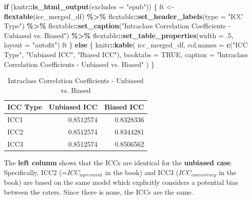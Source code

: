 \documentclass[
]{book}
\newenvironment{Shaded}{\begin{snugshade}}{\end{snugshade}}
\newcommand{\AttributeTok}[1]{\textcolor[rgb]{0.13,0.29,0.53}{#1}}
\newcommand{\ConstantTok}[1]{\textcolor[rgb]{0.56,0.35,0.01}{#1}}
\newcommand{\ControlFlowTok}[1]{\textcolor[rgb]{0.13,0.29,0.53}{\textbf{#1}}}
\newcommand{\DecValTok}[1]{\textcolor[rgb]{0.00,0.00,0.81}{#1}}
\newcommand{\FunctionTok}[1]{\textcolor[rgb]{0.13,0.29,0.53}{\textbf{#1}}}
\newcommand{\NormalTok}[1]{#1}
\newcommand{\OtherTok}[1]{\textcolor[rgb]{0.56,0.35,0.01}{#1}}
\newcommand{\SpecialCharTok}[1]{\textcolor[rgb]{0.81,0.36,0.00}{\textbf{#1}}}
\newcommand{\StringTok}[1]{\textcolor[rgb]{0.31,0.60,0.02}{#1}}
\newcounter{none} %
\begin{document}
\begin{Shaded}
\begin{Highlighting}[]
\ControlFlowTok{if}\NormalTok{ (knitr}\SpecialCharTok{::}\FunctionTok{is\_html\_output}\NormalTok{(}\AttributeTok{excludes =} \StringTok{"epub"}\NormalTok{)) \{}
\NormalTok{  ft }\OtherTok{\textless{}{-}} \FunctionTok{flextable}\NormalTok{(icc\_merged\_df) }\SpecialCharTok{\%\textgreater{}\%}
\NormalTok{    flextable}\SpecialCharTok{::}\FunctionTok{set\_header\_labels}\NormalTok{(}\AttributeTok{type =} \StringTok{"ICC Type"}\NormalTok{) }\SpecialCharTok{\%\textgreater{}\%}
\NormalTok{    flextable}\SpecialCharTok{::}\FunctionTok{set\_caption}\NormalTok{(}\StringTok{"Intraclass Correlation Coefficients {-} Unbiased vs. Biased"}\NormalTok{) }\SpecialCharTok{\%\textgreater{}\%}
\NormalTok{    flextable}\SpecialCharTok{::}\FunctionTok{set\_table\_properties}\NormalTok{(}\AttributeTok{width =}\NormalTok{ .}\DecValTok{5}\NormalTok{, }\AttributeTok{layout =} \StringTok{"autofit"}\NormalTok{)}
\NormalTok{  ft}
\NormalTok{\} }\ControlFlowTok{else}\NormalTok{ \{}
\NormalTok{  knitr}\SpecialCharTok{::}\FunctionTok{kable}\NormalTok{(}
\NormalTok{    icc\_merged\_df,}
    \AttributeTok{col.names =} \FunctionTok{c}\NormalTok{(}\StringTok{"ICC Type"}\NormalTok{, }\StringTok{"Unbiased ICC"}\NormalTok{, }\StringTok{"Biased ICC"}\NormalTok{),}
    \AttributeTok{booktabs =} \ConstantTok{TRUE}\NormalTok{,}
    \AttributeTok{caption =} \StringTok{"Intraclass Correlation Coefficients {-} Unbiased vs. Biased"}
\NormalTok{  )}
\NormalTok{\}}
\end{Highlighting}
\end{Shaded}

\begin{table}

\caption{\label{tab:unnamed-chunk-12}Intraclass Correlation Coefficients - Unbiased vs. Biased}
\centering
\begin{tabular}[t]{lrr}
\toprule
ICC Type & Unbiased ICC & Biased ICC\\
\midrule
ICC1 & 0.8512574 & 0.8328336\\
ICC2 & 0.8512574 & 0.8344281\\
ICC3 & 0.8512574 & 0.8506562\\
\bottomrule
\end{tabular}
\end{table}

The \textbf{left column} shows that the ICCs are identical for the \textbf{unbiased case}.
Specifically, ICC2 (=\(ICC_{agreement}\) in the book) and
ICC3 (\(ICC_{consistency}\) in the book) are based on the same model which explicitly
considers a potential bias between the raters. Since there is none,
the ICCs are the same.
\end{document}
